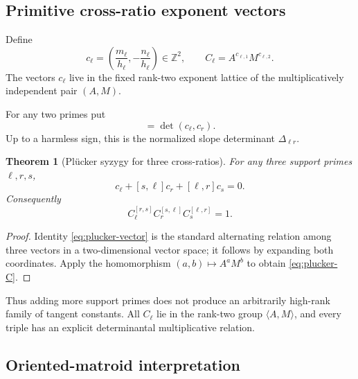 \documentclass[11pt,oneside]{article}
\newtheorem{theorem}{Theorem}[section]
\theoremstyle{definition}
\theoremstyle{remark}
\newcommand{\Z}{\mathbb Z}
\begin{document}
\subsection{Primitive cross-ratio exponent vectors}

Define
\begin{equation}
 c_\ell=\left(\frac{m_\ell}{h_\ell},-\frac{n_\ell}{h_\ell}\right)\in\Z^2,
 \qquad C_\ell=A^{c_{\ell,1}}M^{c_{\ell,2}}.
 \label{eq:c-vector}
\end{equation}
The vectors $c_\ell$ live in the fixed rank-two exponent lattice of the multiplicatively
independent pair $(A,M)$.

For any two primes put
\begin{equation}
 [\ell,r]=\det(c_\ell,c_r).
 \label{eq:bracket}
\end{equation}
Up to a harmless sign, this is the normalized slope determinant
$\Delta_{\ell r}$.

\begin{theorem}[Pl\"ucker syzygy for three cross-ratios]
\label{thm:plucker}
For any three support primes $\ell,r,s$,
\begin{equation}
 [r,s]c_\ell+[s,\ell]c_r+[\ell,r]c_s=0.
 \label{eq:plucker-vector}
\end{equation}
Consequently
\begin{equation}
 C_\ell^{[r,s]}
 C_r^{[s,\ell]}
 C_s^{[\ell,r]}=1.
 \label{eq:plucker-C}
\end{equation}
\end{theorem}

\begin{proof}
Identity \eqref{eq:plucker-vector} is the standard alternating relation among three vectors
in a two-dimensional vector space; it follows by expanding both coordinates.  Apply the
homomorphism $(a,b)\mapsto A^aM^b$ to obtain \eqref{eq:plucker-C}.
\end{proof}

Thus adding more support primes does not produce an arbitrarily high-rank family of tangent
constants.  All $C_\ell$ lie in the rank-two group $\langle A,M\rangle$, and every triple has
an explicit determinantal multiplicative relation.

\subsection{Oriented-matroid interpretation}
\end{document}
